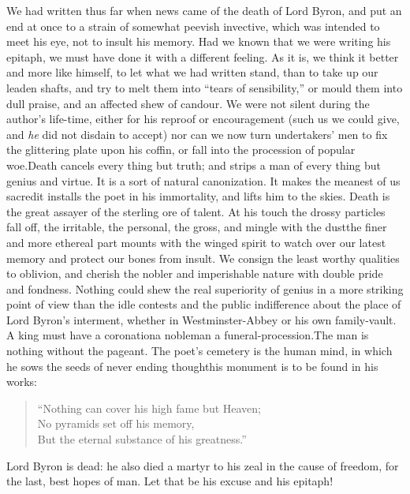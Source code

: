 \bulletrule

We had written thus far when news came of the death of Lord Byron, and
put an end at once to a strain of somewhat peevish invective, which was
intended to meet his eye, not to insult his memory. Had we known that we
were writing his epitaph, we must have done it with a different feeling.
As it is, we think it better and more like himself, to let what we had
written stand, than to take up our leaden shafts, and try to melt them
into ``tears of sensibility,'' or mould them into dull praise, and an
affected shew of candour. We were not silent during the author's
life-time, either for his reproof or encouragement (such us we
could give, and \emph{he} did not disdain to accept) nor can we now turn
undertakers' men to fix the glittering plate upon his coffin, or fall
into the procession of popular woe.\textemdash Death cancels every thing but
truth; and strips a man of every thing but genius and virtue. It is a
sort of natural canonization. It makes the meanest of us sacred\textemdash it
installs the poet in his immortality, and lifts him to the skies. Death
is the great assayer of the sterling ore of talent. At his touch the
drossy particles fall off, the irritable, the personal, the gross, and
mingle with the dust\textemdash the finer and more ethereal part mounts with the
winged spirit to watch over our latest memory and protect our bones from
insult. We consign the least worthy qualities to oblivion, and cherish
the nobler and imperishable nature with double pride and fondness.
Nothing could shew the real superiority of genius in a more striking
point of view than the idle contests and the public indifference about
the place of Lord Byron's interment, whether in Westminster-Abbey or
his own family-vault. A king must have a coronation\textemdash a nobleman a
funeral-procession.\textemdash The man is nothing without the pageant. The poet's
cemetery is the human mind, in which he sows the seeds of never ending
thought\textemdash his monument is to be found in his works:
\begin{quote}
  ``Nothing can cover his high fame but Heaven; \\
  No pyramids set off his memory, \\
  But the eternal substance of his greatness.''
\end{quote}
Lord Byron is dead: he also died a martyr to his zeal in the cause of
freedom, for the last, best hopes of man. Let that be his excuse and his
epitaph!